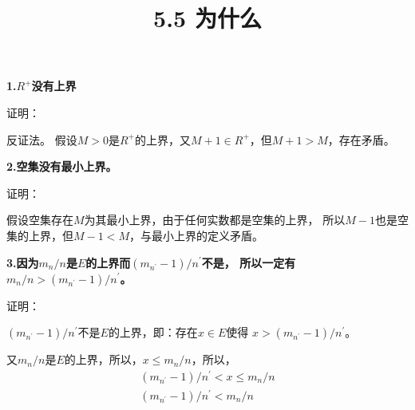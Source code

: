 \documentclass{article}
\theoremstyle{mystyle}
\begin{document}
\title{5.5 为什么}
\maketitle


\textbf{1.$R^{+}$没有上界}

证明：

反证法。
假设$M>0$是$R^{+}$的上界，又$M + 1 \in R^+$，但$M + 1 > M$，存在矛盾。

\textbf{2.空集没有最小上界。}

证明：

假设空集存在$M$为其最小上界，由于任何实数都是空集的上界，
所以$M - 1$也是空集的上界，但$M - 1 < M$，与最小上界的定义矛盾。

\textbf{
  3.因为$m_n/n$是$E$的上界而$(m_{n^\prime}-1)/n^\prime$不是，
  所以一定有$m_n/n > (m_{n^\prime}-1)/n^\prime$。
}

证明：

$(m_{n^\prime}-1)/n^\prime$不是$E$的上界，即：存在$x \in E$使得
$x > (m_{n^\prime}-1)/n^\prime$。

又$m_n/n$是$E$的上界，所以，$x \leq m_n/n$，所以，
\begin{align*}
  (m_{n^\prime}-1)/n^\prime < x \leq m_n/n \\
  (m_{n^\prime}-1)/n^\prime < m_n/n
\end{align*}
\end{document}

